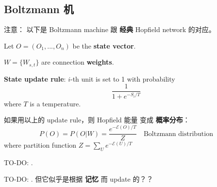 \begin{preview}
\begin{minipage}{\textwidth}
\subsection{Boltzmann 机}

注意： 以下是 Boltzmann machine 跟 \textbf{经典} Hopfield network 的对应。

Let $O = (O_1, ..., O_n)$ be the \textbf{state vector}.

$W = \{ W_{s,t} \}$ are connection \textbf{weights}.

\textbf{State update rule}:  $i$-th unit is set to 1 with probability
\begin{equation}
\frac{1}{1 + e^{- S_i / T}}
\end{equation}
where $T$ is a temperature.

如果用以上的 update rule，则 Hopfield 能量 变成 \textbf{概率分布}：
\begin{equation}
P(O) = P(O|W) = \frac{e^{-\mathcal{E}(O)/T}}{Z} \quad \boxed{\mbox{Boltzmann distribution}}
\end{equation}
where partition function $\displaystyle Z = \sum_U e^{-\mathcal{E}(U)/T} $

{\color{red}TO-DO:} .


{\color{red}TO-DO:} .  但它似乎是根据 \textbf{记忆} 而 update 的？？

\end{minipage}
\end{preview}

